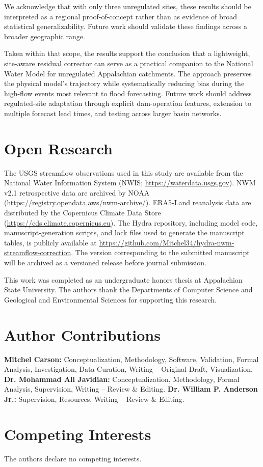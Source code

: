 \documentclass[draft]{agujournal2019}
\begin{document}
We acknowledge that with only three unregulated sites, these results should be interpreted as a regional proof-of-concept rather than as evidence of broad statistical generalizability. Future work should validate these findings across a broader geographic range.

Taken within that scope, the results support the conclusion that a lightweight, site-aware residual corrector can serve as a practical companion to the National Water Model for unregulated Appalachian catchments. The approach preserves the physical model's trajectory while systematically reducing bias during the high-flow events most relevant to flood forecasting. Future work should address regulated-site adaptation through explicit dam-operation features, extension to multiple forecast lead times, and testing across larger basin networks.


\section*{Open Research}
The USGS streamflow observations used in this study are available from the National Water Information System (NWIS; \url{https://waterdata.usgs.gov}). NWM v2.1 retrospective data are archived by NOAA (\url{https://registry.opendata.aws/nwm-archive/}). ERA5-Land reanalysis data are distributed by the Copernicus Climate Data Store (\url{https://cds.climate.copernicus.eu}). The Hydra repository, including model code, manuscript-generation scripts, and lock files used to generate the manuscript tables, is publicly available at \url{https://github.com/Mitchel34/hydra-nwm-streamflow-correction}. The version corresponding to the submitted manuscript will be archived as a versioned release before journal submission.


\acknowledgments
This work was completed as an undergraduate honors thesis at Appalachian State University. The authors thank the Departments of Computer Science and Geological and Environmental Sciences for supporting this research.

\section*{Author Contributions}
\textbf{Mitchel Carson:} Conceptualization, Methodology, Software, Validation, Formal Analysis, Investigation, Data Curation, Writing -- Original Draft, Visualization. \textbf{Dr. Mohammad Ali Javidian:} Conceptualization, Methodology, Formal Analysis, Supervision, Writing -- Review \& Editing. \textbf{Dr. William P. Anderson Jr.:} Supervision, Resources, Writing -- Review \& Editing.

\section*{Competing Interests}
The authors declare no competing interests.



\end{document}
